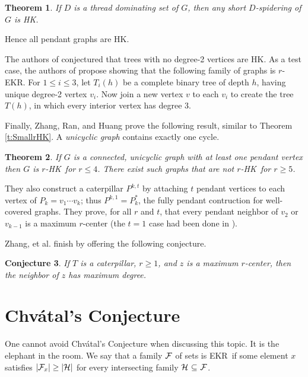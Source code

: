 \documentclass{article}
\newtheorem{thm}{Theorem}%
\newtheorem{cnj}[thm]{Conjecture}
\def\cF{{\cal F}}
\def\cH{{\cal H}}
\def\ekr{{\sf EKR}}
\def\hk{{\sf HK}}
\def\sse{{\subseteq}}
\begin{document}
\begin{thm}
\label{t:ShortSpidering}
If $D$ is a thread dominating set of $G$, then any short $D$-spidering of $G$ is \hk.
\end{thm}

Hence all pendant graphs are \hk.

The authors of \cite{HurlKamaTrees} conjectured that trees with no degree-2 vertices are \hk.
As a test case, the authors of \cite{FranHurl} propose showing that the following family of graphs is $r$-\ekr.
For $1\le i\le 3$, let $T_i(h)$ be a complete binary tree of depth $h$, having unique degree-2 vertex $v_i$.
Now join a new vertex $v$ to each $v_i$ to create the tree $T(h)$, in which every interior vertex has degree 3.

Finally, Zhang, Ran, and Huang \cite{ZhaRanHua} prove the following result, similar to Theorem \ref{t:SmallrHK}.
A {\it unicyclic graph} contains exactly one cycle.

\begin{thm}
\label{t:Uni}
If $G$ is a connected, unicyclic graph with at least one pendant vertex then $G$ is $r$-\hk\ for $r\le 4$.
There exist such graphs that are not $r$-\hk\ for $r\ge 5$.
\end{thm}

They also construct a caterpillar $P^{k,t}$ by attaching $t$ pendant vertices to each vertex of $P_k=v_1\cdots v_k$; thus $P^{k,1}=P_k^*$, the fully pendant contruction for well-covered graphs.
They prove, for all $r$ and $t$, that every pendant neighbor of $v_2$ or $v_{k-1}$ is a maximum $r$-center (the $t=1$ case had been done in \cite{DeDiDuHa}).

Zhang, et al. finish by offering the following conjecture.

\begin{cnj}
\label{j:LeafCenterNbr}
If $T$ is a caterpillar, $r\ge 1$, and $z$ is a maximum $r$-center, then the neighbor of $z$ has maximum degree.
\end{cnj}



\section{Chv\'atal's Conjecture}

One cannot avoid Chv\'atal's Conjecture \cite{Chvatal} when discussing this topic.
It is the elephant in the room.
We say that a family $\cF$ of sets is \ekr\ if some element $x$ satisfies $|\cF_x|\ge |\cH|$ for every intersecting family $\cH\ \sse\ \cF$.
\end{document}
